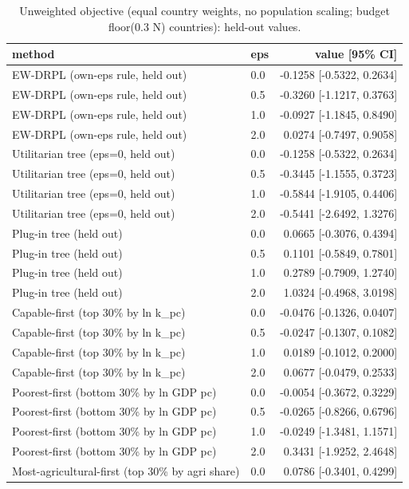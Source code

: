 \begin{table}[htbp]
\centering
\caption{Unweighted objective (equal country weights, no population scaling; budget floor(0.3 N) countries): held-out values.}
\label{tab:agri_unw}
\begin{tabular}{llr}
\toprule
method & eps & value [95\% CI] \\
\midrule
EW-DRPL (own-eps rule, held out) & 0.0 & -0.1258 [-0.5322, 0.2634] \\
EW-DRPL (own-eps rule, held out) & 0.5 & -0.3260 [-1.1217, 0.3763] \\
EW-DRPL (own-eps rule, held out) & 1.0 & -0.0927 [-1.1845, 0.8490] \\
EW-DRPL (own-eps rule, held out) & 2.0 & 0.0274 [-0.7497, 0.9058] \\
Utilitarian tree (eps=0, held out) & 0.0 & -0.1258 [-0.5322, 0.2634] \\
Utilitarian tree (eps=0, held out) & 0.5 & -0.3445 [-1.1555, 0.3723] \\
Utilitarian tree (eps=0, held out) & 1.0 & -0.5844 [-1.9105, 0.4406] \\
Utilitarian tree (eps=0, held out) & 2.0 & -0.5441 [-2.6492, 1.3276] \\
Plug-in tree (held out) & 0.0 & 0.0665 [-0.3076, 0.4394] \\
Plug-in tree (held out) & 0.5 & 0.1101 [-0.5849, 0.7801] \\
Plug-in tree (held out) & 1.0 & 0.2789 [-0.7909, 1.2740] \\
Plug-in tree (held out) & 2.0 & 1.0324 [-0.4968, 3.0198] \\
Capable-first (top 30\% by ln k\_pc) & 0.0 & -0.0476 [-0.1326, 0.0407] \\
Capable-first (top 30\% by ln k\_pc) & 0.5 & -0.0247 [-0.1307, 0.1082] \\
Capable-first (top 30\% by ln k\_pc) & 1.0 & 0.0189 [-0.1012, 0.2000] \\
Capable-first (top 30\% by ln k\_pc) & 2.0 & 0.0677 [-0.0479, 0.2533] \\
Poorest-first (bottom 30\% by ln GDP pc) & 0.0 & -0.0054 [-0.3672, 0.3229] \\
Poorest-first (bottom 30\% by ln GDP pc) & 0.5 & -0.0265 [-0.8266, 0.6796] \\
Poorest-first (bottom 30\% by ln GDP pc) & 1.0 & -0.0249 [-1.3481, 1.1571] \\
Poorest-first (bottom 30\% by ln GDP pc) & 2.0 & 0.3431 [-1.9252, 2.4648] \\
Most-agricultural-first (top 30\% by agri share) & 0.0 & 0.0786 [-0.3401, 0.4299] \\

\end{tabular}
\end{table}
